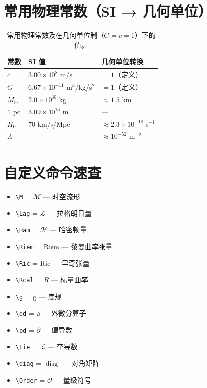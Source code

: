 \section{常用物理常数（SI → 几何单位）}

\begin{table}[htbp]
\centering
\begin{tabular}{lll}
\toprule
常数 & SI 值 & 几何单位转换 \\
\midrule
$c$ & $3.00 \times 10^8$ m/s & $=1$（定义） \\
$G$ & $6.67 \times 10^{-11}$ m$^3$/kg/s$^2$ & $=1$（定义） \\
$M_\odot$ & $2.0 \times 10^{30}$ kg & $\approx 1.5$ km \\
$1$ pc & $3.09 \times 10^{16}$ m & — \\
$H_0$ & $70$ km/s/Mpc & $\approx 2.3 \times 10^{-18}$ s$^{-1}$ \\
$\Lambda$ & — & $\approx 10^{-52}$ m$^{-2}$ \\
\bottomrule
\end{tabular}
\caption{常用物理常数及在几何单位制（$G=c=1$）下的值。}
\end{table}

\section{自定义命令速查}

\begin{itemize}
    \item \verb|\M| = $\mathcal{M}$ — 时空流形
    \item \verb|\Lag| = $\mathcal{L}$ — 拉格朗日量
    \item \verb|\Ham| = $\mathcal{H}$ — 哈密顿量
    \item \verb|\Riem| = $\mathrm{Riem}$ — 黎曼曲率张量
    \item \verb|\Ric| = $\mathrm{Ric}$ — 里奇张量
    \item \verb|\Rcal| = $R$ — 标量曲率
    \item \verb|\g| = $\mathrm{g}$ — 度规
    \item \verb|\dd| = $\dd$ — 外微分算子
    \item \verb|\pd| = $\partial$ — 偏导数
    \item \verb|\Lie| = $\mathcal{L}$ — 李导数
    \item \verb|\diag| = $\operatorname{diag}$ — 对角矩阵
    \item \verb|\Order| = $\mathcal{O}$ — 量级符号
\end{itemize}
